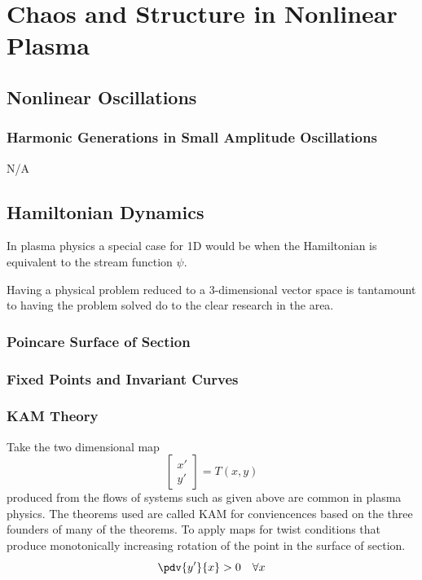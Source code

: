 \chapter{Chaos and Structure in Nonlinear Plasma}

\section{Nonlinear Oscillations}

\subsection{Harmonic Generations in Small Amplitude Oscillations}

N/A

\section{Hamiltonian Dynamics}

In plasma physics a special case for 1D would be when the Hamiltonian is equivalent to the stream function $\psi$.

Having a physical problem reduced to a 3-dimensional vector space is tantamount to having the problem solved do to the clear research in the area.

\subsection{Poincare Surface of Section}

\subsection{Fixed Points and Invariant Curves}



\subsection{KAM Theory}

Take the two dimensional map
\[
\begin{bmatrix}
x' \\
y'
\end{bmatrix}

=
T(x,y)
\]
produced from the flows of systems such as given above are common in plasma physics. The theorems used are called KAM for conviencences based on the three founders of many of the theorems. To apply maps for twist conditions that produce monotonically increasing rotation of the point in the surface of section.
\[
\pdv{y'}{x} > 0 \quad \forall x
  \]

